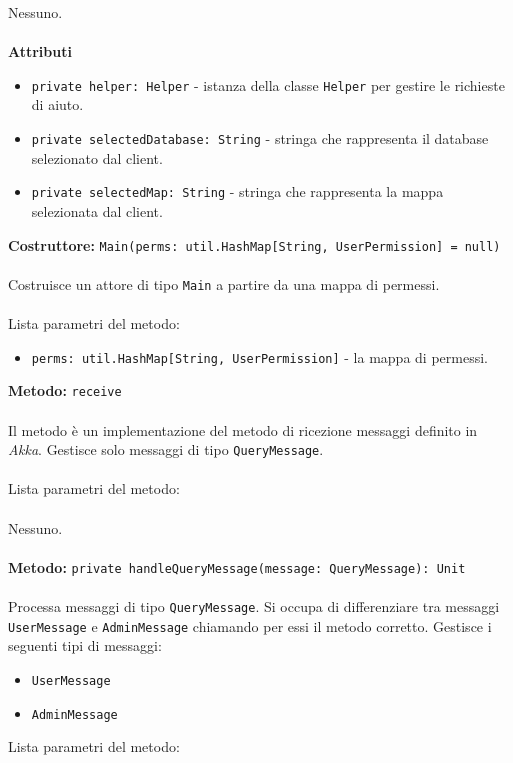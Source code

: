 \documentclass[a4paper]{article}
\begin{document}
			Nessuno.
			\\ \\
		\textbf{Attributi}
			\begin{itemize}
				\item \texttt{private helper: Helper} - istanza della classe \texttt{Helper} per gestire le richieste di aiuto.
				\item \texttt{private selectedDatabase: String} - stringa che rappresenta il database selezionato dal client.
				\item \texttt{private selectedMap: String} - stringa che rappresenta la mappa selezionata dal client.
			\end{itemize}
		\textbf{Costruttore: }\texttt{Main(perms: util.HashMap[String, UserPermission] = null)}
			\\ \\
			Costruisce un attore di tipo \texttt{Main} a partire da una mappa di permessi.
			\\ \\
			Lista parametri del metodo:
			\begin{itemize}
				\item \texttt{perms: util.HashMap[String, UserPermission]} - la mappa di permessi.
			\end{itemize}
		\textbf{Metodo: }\texttt{receive}
			\\ \\
			Il metodo è un implementazione del metodo di ricezione messaggi definito in \emph{Akka}. Gestisce solo messaggi di tipo \texttt{QueryMessage}.
			\\ \\
			Lista parametri del metodo:
			\\ \\
			Nessuno.
			\\ \\
		\textbf{Metodo: }\texttt{private handleQueryMessage(message: QueryMessage): Unit}
			\\ \\
			Processa messaggi di tipo \texttt{QueryMessage}. Si occupa di differenziare tra messaggi \texttt{UserMessage} e \texttt{AdminMessage} chiamando per essi il metodo corretto.
			Gestisce i seguenti tipi di messaggi:
			\begin{itemize}
				\item \texttt{UserMessage}
				\item \texttt{AdminMessage}
			\end{itemize}
			Lista parametri del metodo:
\end{document}
